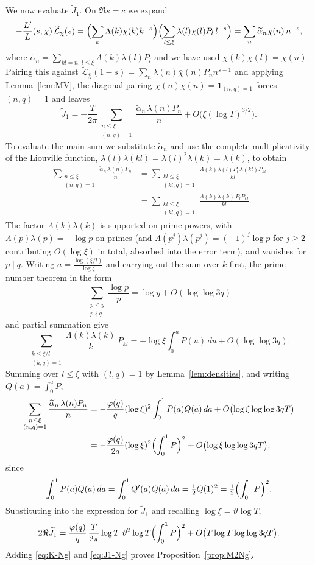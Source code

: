 \documentclass[12pt,a4paper,reqno]{amsart}
\theoremstyle{remark}
\numberwithin{equation}{section}
\begin{document}
We now evaluate $\widetilde J_1$. On $\Re s=c$ we expand
\[
-\frac{L'}{L}(s,\chi)\,\widetilde{\mathcal L}_\chi(s)=\Bigl(\sum_k\Lambda(k)\chi(k)k^{-s}\Bigr)\Bigl(\sum_{l\le\xi}\lambda(l)\chi(l)P_l\,l^{-s}\Bigr)=\sum_n\widetilde\alpha_n\chi(n)\,n^{-s},
\]
where $\widetilde\alpha_n=\sum_{kl=n,\,l\le\xi}\Lambda(k)\lambda(l)P_l$ and we have used $\chi(k)\chi(l)=\chi(n)$. Pairing this against $\widetilde{\mathcal L}_{\bar\chi}(1-s)=\sum_n\lambda(n)\bar\chi(n)P_n n^{s-1}$ and applying Lemma~\ref{lem:MV}, the diagonal pairing $\chi(n)\overline{\chi(n)}=\mathbf 1_{(n,q)=1}$ forces $(n,q)=1$ and leaves
\[
\widetilde J_1=-\frac{T}{2\pi}\sum_{\substack{n\le\xi\\(n,q)=1}}\frac{\widetilde\alpha_n\,\lambda(n)P_n}{n}+O\bigl(\xi(\log T)^{3/2}\bigr).
\]
To evaluate the main sum we substitute $\widetilde\alpha_n$ and use the complete multiplicativity of the Liouville function, $\lambda(l)\lambda(kl)=\lambda(l)^2\lambda(k)=\lambda(k)$, to obtain
\[
\begin{aligned}
\sum_{\substack{n\le\xi\\(n,q)=1}}\frac{\widetilde\alpha_n\,\lambda(n)P_n}{n}
&=\sum_{\substack{kl\le\xi\\(kl,q)=1}}\frac{\Lambda(k)\lambda(l)P_l\,\lambda(kl)P_{kl}}{kl}\\
&=\sum_{\substack{kl\le\xi\\(kl,q)=1}}\frac{\Lambda(k)\lambda(k)\,P_l P_{kl}}{kl}.
\end{aligned}
\]
The factor $\Lambda(k)\lambda(k)$ is supported on prime powers, with $\Lambda(p)\lambda(p)=-\log p$ on primes (and $\Lambda(p^j)\lambda(p^j)=(-1)^j\log p$ for $j\ge2$ contributing $O(\log\xi)$ in total, absorbed into the error term), and vanishes for $p\mid q$. Writing $a=\frac{\log(\xi/l)}{\log\xi}$ and carrying out the sum over $k$ first, the prime number theorem in the form
\[
\sum_{\substack{p\le y\\ p\nmid q}}\frac{\log p}{p}=\log y+O(\log\log 3q)
\]
and partial summation give
\[
\sum_{\substack{k\le\xi/l\\(k,q)=1}}\frac{\Lambda(k)\lambda(k)}{k}\,P_{kl}=-\log\xi\int_0^a P(u)\,du+O(\log\log 3q).
\]
Summing over $l\le\xi$ with $(l,q)=1$ by Lemma~\ref{lem:densities}, and writing $Q(a)=\int_0^a P$,
\[
\begin{aligned}
\sum_{\substack{n\le\xi\\(n,q)=1}}\frac{\widetilde\alpha_n\,\lambda(n)P_n}{n}
&=-\frac{\varphi(q)}{q}(\log\xi)^2\int_0^1 P(a)Q(a)\,da+O\bigl(\log\xi\log\log 3qT\bigr)\\
&=-\frac{\varphi(q)}{2q}(\log\xi)^2\Bigl(\int_0^1 P\Bigr)^2+O\bigl(\log\xi\log\log 3qT\bigr),
\end{aligned}
\]
since
\[
\int_0^1 P(a)Q(a)\,da=\int_0^1 Q'(a)Q(a)\,da=\tfrac12 Q(1)^2=\tfrac12\Bigl(\int_0^1 P\Bigr)^2.
\]
Substituting into the expression for $\widetilde J_1$ and recalling $\log\xi=\vartheta\log T$,
\begin{equation}\label{eq:J1-Ng}
2\Re\widetilde J_1=\frac{\varphi(q)}{q}\,\frac{T}{2\pi}\log T\;\vartheta^2\log T\Bigl(\int_0^1 P\Bigr)^2+O\bigl(T\log T\log\log 3qT\bigr).
\end{equation}
Adding \eqref{eq:K-Ng} and \eqref{eq:J1-Ng} proves Proposition~\ref{prop:M2Ng}.
\end{document}
